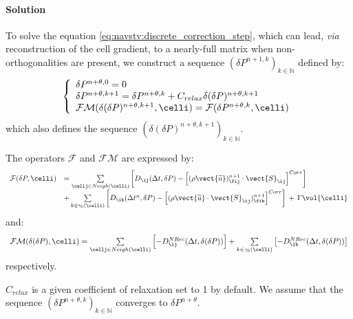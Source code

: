 \paragraph{Solution\\}
To solve the equation \eqref{eq:navstv:discrete_correction_step}, which can
lead, \emph{via}  reconstruction of the cell gradient, to a nearly-full matrix
when non-orthogonalities are present, we construct a sequence
$(\delta P^{n+1,k})_{k\in \mathbb{N}}$ defined by:
\begin{equation}
\left\{\begin{array}{l}
\delta P^{n+\theta,0} = 0\\
\delta P^{n+\theta,k+1} = \delta P^{n+\theta,k} + C_{relax} \delta (\delta P)^{n+\theta,k+1}\\
\mathcal{FM}(\delta(\delta P)^{n+\theta,k+1}, \celli) = \mathcal{F}(\delta P^{n+\theta,k}, \celli)
\end{array}\right.
\end{equation}
which also defines the sequence $({\delta(\delta P)^{n+\theta,k+1}})_{k\in
\mathbb{N}}$.

The operators $\mathcal{F}$ and $\mathcal{FM}$ are expressed by:
\begin{equation}
\begin{array}{ll}
\mathcal{F}(\delta P, \celli) &=
 \sum\limits_{\cellj\in Neigh(\celli)}{\left[D_{\ij}(\Delta t,\delta
  P)-\left[(\rho \vect{\widetilde{u}})^{n+1}_{\fij} \cdot \vect{S}_\ij \right]^{Corr}\right]}\\
&+\sum\limits_{k\in {\gamma_b(\celli)}} {\left[D_{\ib}(\Delta
  t^n,\delta P)-\left[(\rho \vect{\widetilde{u}} \cdot \vect{S}_\ij )^{n+1}_{\fib}\right]^{Corr}\right]\,+\,\Gamma \vol{\celli}}
\end{array}
\end{equation}
%
and:
\begin{equation}
\begin{array}{ll}
\mathcal{FM}(\delta (\delta P), \celli) =
 \sum\limits_{\cellj \in Neigh(\celli)}{\left[-D^{NRec}_{\ij}(\Delta t,\delta
(\delta P))\right]} +\sum\limits_{k\in {\gamma_b(\celli)}}
\left[-D^{NRec}_{\ib}(\Delta t,\delta(\delta P))\right]
\end{array}
\end{equation}
respectively.

$C_{relax}$ is a given coefficient of relaxation set to 1 by default.
We assume that the sequence $(\delta P^{n+\theta,k})_{k\in \mathbb{N}}$
converges
to $\delta P^{n+\theta}$.

